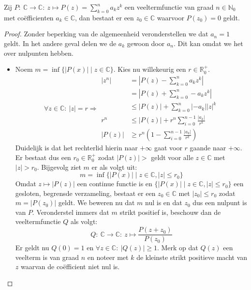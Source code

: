 \documentclass[main.tex]{subfiles}
\begin{document}
\begin{bst}
  Zij $P:\ \mathbb{C} \rightarrow \mathbb{C}:\ z \mapsto P(z) = \sum_{k=0}^{n}a_{k}z^{k}$ een veeltermfunctie van graad $n\in \mathbb{N}_{0}$ met co\"efficienten $a_{k}\in \mathbb{C}$, dan bestaat er een $z_{0}\in \mathbb{C}$ waarvoor $P(z_{0})=0$ geldt.

  \begin{proof}
    Zonder beperking van de algemeenheid veronderstellen we dat $a_{n}=1$ geldt.
    In het andere geval delen we de $a_{k}$ gewoon door $a_{n}$.
    Dit kan omdat we het over nulpunten hebben.
    \begin{itemize}
    \item Noem $m = \inf\{ |P(x)| \mid z\in \mathbb{C} \}$.
      Kies nu willekeurig een $r\in \mathbb{R}_{0}^{+}$.
      \[
      \forall z\in \mathbb{C}:\ |z| = r \Rightarrow
      \begin{array}{rl}
        |z^{n}|
        &= \left|P(z) - \sum_{k=0}^{n}a_{k}z^{k}\right|\\
        &= \left|P(z) + \sum_{k=0}^{n}-a_{k}z^{k}\right|\\
        &\le \left|P(z)\right| + \sum_{k=0}^{n}|-a_{k}||z|^{k}\\
        r^{n}&\le \left|P(z)\right| + r^{n}\sum_{i=0}^{n-1}\frac{|a_{k}|}{r^{k}}\\
        |P(z)| &\ge r^{n}\left(1-\sum_{i=0}^{n-1}\frac{|a_{k}|}{r^{k}}\right)
      \end{array}     
      \]
      Duidelijk is dat het rechterlid hierin naar $+\infty$ gaat voor $r$ gaande naar $+\infty$.
      Er bestaat dus een $r_{0}\in \mathbb{R}_{0}^{+}$ zodat $|P(z)| > $ geldt voor alle $z\in \mathbb{C}$ met $|z| > r_{0}$.
      Bijgevolg ziet $m$ er als volgt uit:
      \[ m =  \inf\{ |P(x)| \mid z\in \mathbb{C}, |z| \le r_{0} \} \]
      Omdat $z \mapsto |P(z)|$ een continue functie is en $\{ |P(x)| \mid z\in \mathbb{C}, |z| \le r_{0} \}$ een gesloten, begrensde verzameling, bestaat er een $z_{0}\in \mathbb{C}$ met $|z_{0}| \le r_{0}$ zodat $m = |P(z_{0})|$ geldt.\waarom
      We beweren nu dat $m$ nul is en dat $z_{0}$ dus een nulpunt is van $P$.
      Veronderstel immers dat $m$ strikt positief is, beschouw dan de veeltermfunctie $Q$ als volgt:
      \[ Q:\ \mathbb{C} \rightarrow \mathbb{C}:\ z \mapsto \frac{P(z+z_{0})}{P(z_{0})} \]
      Er geldt nu $Q(0)=1$ en $\forall z \in \mathbb{C}:\ |Q(z)| \ge 1$.
      Merk op dat $Q(z)$ een veelterm is van graad $n$ en noteer met $k$ de kleinste strikt positieve macht van $z$ waarvan de co\"efficient niet nul is.

\end{itemize}
\end{proof}
\end{bst}
\end{document}
